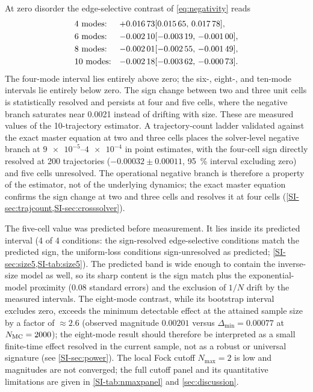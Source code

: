 \documentclass[aps,pra,preprint,superscriptaddress,amsmath,amssymb]{revtex4-2}
\begin{document}
At zero disorder the edge-selective contrast of \eqref{eq:negativity} reads
\begin{align*}
  &\text{\num{4} modes:} & +\num{0.01673} & [\num{0.01565},\,\num{0.01778}],\\
  &\text{\num{6} modes:} & -\num{0.00210} & [\num{-0.00319},\,\num{-0.00100}],\\
  &\text{\num{8} modes:} & -\num{0.00201} & [\num{-0.00255},\,\num{-0.00149}],\\
  &\text{\num{10} modes:} & -\num{0.00218} & [\num{-0.00362},\,\num{-0.00073}].
\end{align*}
The four-mode interval lies entirely above zero; the six-, eight-, and ten-mode intervals lie entirely below zero. The sign change between two and three unit cells is statistically resolved and persists at four and five cells, where the negative branch saturates near \num{0.0021} instead of drifting with size. These are measured values of the \num{10}-trajectory estimator. A trajectory-count ladder validated against the exact master equation at two and three cells places the solver-level negative branch at $\num{9e-5}$--$\num{4e-4}$ in point estimates, with the four-cell sign directly resolved at \num{200} trajectories ($-\num{0.00032}\pm\num{0.00011}$, \qty{95}{\percent} interval excluding zero) and five cells unresolved. The operational negative branch is therefore a property of the estimator, not of the underlying dynamics; the exact master equation confirms the sign change at two and three cells and resolves it at four cells (\cref{SI-sec:trajcount,SI-sec:crosssolver}).

The five-cell value was predicted before measurement. It lies inside its predicted interval (\num{4} of \num{4} conditions: the sign-resolved edge-selective conditions match the predicted sign, the uniform-loss conditions sign-unresolved as predicted; \cref{SI-sec:size5,SI-tab:size5}). The predicted band is wide enough to contain the inverse-size model as well, so its sharp content is the sign match plus the exponential-model proximity (\num{0.08} standard errors) and the exclusion of $1/N$ drift by the measured intervals. The eight-mode contrast, while its bootstrap interval~\cite{Efron1979} excludes zero, exceeds the minimum detectable effect at the attained sample size by a factor of $\approx\num{2.6}$ (observed magnitude $\num{0.00201}$ versus $\Delta_{\min}=\num{0.00077}$ at $N_{\rm MC}=\num{2000}$); the eight-mode result should therefore be interpreted as a small finite-time effect resolved in the current sample, not as a robust or universal signature (see \cref{SI-sec:power}). The local Fock cutoff $N_{\max}=\num{2}$ is low and magnitudes are not converged; the full cutoff panel and its quantitative limitations are given in \cref{SI-tab:nmaxpanel} and \cref{sec:discussion}.
\end{document}
